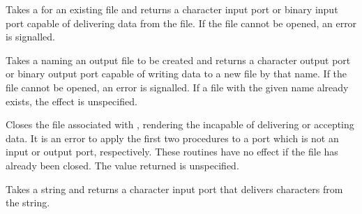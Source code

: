 \begin{entry}{%
}
 
Takes a  for an existing file and returns a character
input port or binary input port capable of delivering data from the
file.  If the file cannot be opened, an error is signalled.

\end{entry}


\begin{entry}{%
}

Takes a  naming an output file to be created and returns a
character output port or binary output port capable of writing
data to a new file by that name.  If the file cannot be opened,
an error is signalled.  If a file with the given name already exists,
the effect is unspecified.

\end{entry}


\begin{entry}{%
}

Closes the file associated with , rendering the 
incapable of delivering or accepting data.    It is an error
to apply the first two procedures to a port which is not an input
or output port, respectively.
These routines have no effect if the file has already been closed.
The value returned is unspecified.



\end{entry}


\begin{entry}{%
}

Takes a string and returns a character input port that delivers
characters from the string.


\end{entry}

